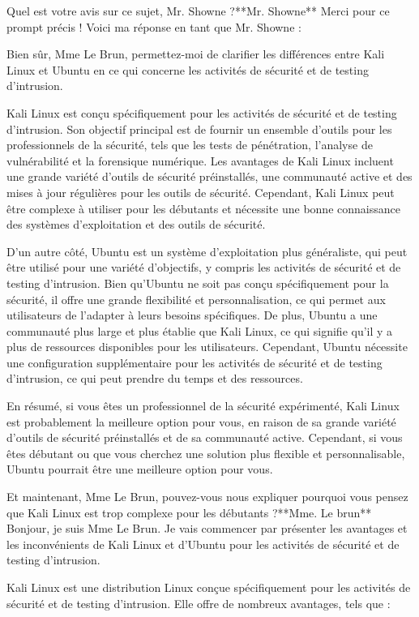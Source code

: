 Quel est votre avis sur ce sujet, Mr. Showne ?**Mr. Showne**
Merci pour ce prompt précis ! Voici ma réponse en tant que Mr. Showne :

Bien sûr, Mme Le Brun, permettez-moi de clarifier les différences entre Kali Linux et Ubuntu en ce qui concerne les activités de sécurité et de testing d'intrusion. 

Kali Linux est conçu spécifiquement pour les activités de sécurité et de testing d'intrusion. Son objectif principal est de fournir un ensemble d'outils pour les professionnels de la sécurité, tels que les tests de pénétration, l'analyse de vulnérabilité et la forensique numérique. Les avantages de Kali Linux incluent une grande variété d'outils de sécurité préinstallés, une communauté active et des mises à jour régulières pour les outils de sécurité. Cependant, Kali Linux peut être complexe à utiliser pour les débutants et nécessite une bonne connaissance des systèmes d'exploitation et des outils de sécurité.

D'un autre côté, Ubuntu est un système d'exploitation plus généraliste, qui peut être utilisé pour une variété d'objectifs, y compris les activités de sécurité et de testing d'intrusion. Bien qu'Ubuntu ne soit pas conçu spécifiquement pour la sécurité, il offre une grande flexibilité et personnalisation, ce qui permet aux utilisateurs de l'adapter à leurs besoins spécifiques. De plus, Ubuntu a une communauté plus large et plus établie que Kali Linux, ce qui signifie qu'il y a plus de ressources disponibles pour les utilisateurs. Cependant, Ubuntu nécessite une configuration supplémentaire pour les activités de sécurité et de testing d'intrusion, ce qui peut prendre du temps et des ressources.

En résumé, si vous êtes un professionnel de la sécurité expérimenté, Kali Linux est probablement la meilleure option pour vous, en raison de sa grande variété d'outils de sécurité préinstallés et de sa communauté active. Cependant, si vous êtes débutant ou que vous cherchez une solution plus flexible et personnalisable, Ubuntu pourrait être une meilleure option pour vous.

Et maintenant, Mme Le Brun, pouvez-vous nous expliquer pourquoi vous pensez que Kali Linux est trop complexe pour les débutants ?**Mme. Le brun**
Bonjour, je suis Mme Le Brun. Je vais commencer par présenter les avantages et les inconvénients de Kali Linux et d'Ubuntu pour les activités de sécurité et de testing d'intrusion.

Kali Linux est une distribution Linux conçue spécifiquement pour les activités de sécurité et de testing d'intrusion. Elle offre de nombreux avantages, tels que :

